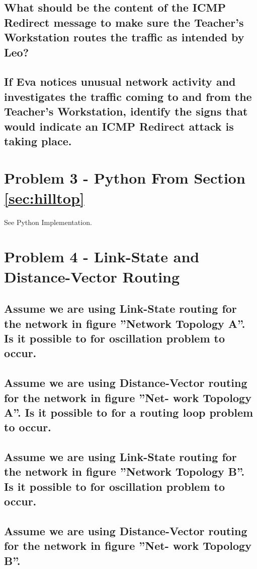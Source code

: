 \documentclass{article}
\begin{document}
\subsection{What should be the content of the ICMP Redirect message to make sure the
Teacher’s Workstation routes the traffic as intended by Leo?}

\subsection{If Eva notices unusual network activity and investigates the traffic coming to
and from the Teacher’s Workstation, identify the signs that would indicate an ICMP
Redirect attack is taking place.}

\section{Problem 3 - Python From Section \ref{sec:hilltop}}

See Python Implementation.

\section{Problem 4 - Link-State and Distance-Vector Routing}

\subsection{Assume we are using Link-State routing for the network in figure  ”Network
Topology A”. Is it possible to for oscillation problem to occur.}

\subsection{Assume we are using Distance-Vector routing for the network in figure ”Net-
work Topology A”. Is it possible to for a routing loop problem to occur.}

\subsection{Assume we are using Link-State routing for the network in figure ”Network
Topology B”. Is it possible to for oscillation problem to occur.}

\subsection{Assume we are using Distance-Vector routing for the network in figure ”Net-
work Topology B”.}
\end{document}
